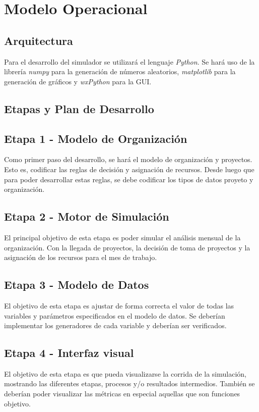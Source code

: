 \documentclass[a4paper,10pt]{article}
\begin{document}
\section{Modelo Operacional}

\subsection{Arquitectura}

Para el desarrollo del simulador se utilizará el lenguaje \textit{Python}. Se hará uso de la librería \textit{numpy} para la generación de números aleatorios, \textit{matplotlib}
para la generación de gráficos y \textit{wxPython} para la GUI.\\

\subsection{Etapas y Plan de Desarrollo}

\subsection*{Etapa 1 - Modelo de Organización}
Como primer paso del desarrollo, se hará el modelo de organización y proyectos. Esto es, codificar las reglas de decisión y asignación de recursos. Desde luego que para poder 
desarrollar estas reglas, se debe codificar los tipos de datos proyeto y organización.\\

\subsection*{Etapa 2 - Motor de Simulación}
El principal objetivo de esta etapa es poder simular el análisis mensual de la organización. Con la llegada de proyectos, la decisión de toma de proyectos y la asignación de los 
recursos para el mes de trabajo.\\

\subsection*{Etapa 3 - Modelo de Datos}
El objetivo de esta etapa es ajustar de forma correcta el valor de todas las variables y parámetros especificados en el modelo de datos. Se deberían implementar los 
generadores de cada variable y deberían ser verificados.\\

\subsection*{Etapa 4 - Interfaz visual}
El objetivo de esta etapa es que pueda visualizarse la corrida de la simulación, mostrando las diferentes etapas, procesos y/o resultados intermedios. También se deberían
poder visualizar las métricas en especial aquellas que son funciones objetivo.\\
\end{document}

